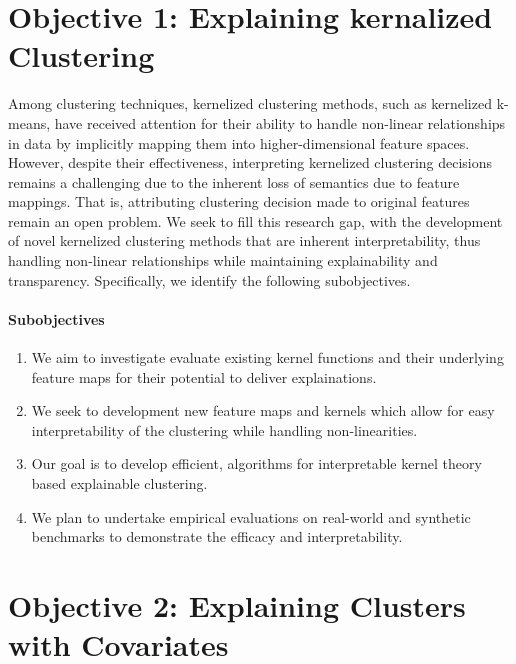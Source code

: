 \documentclass[10pt,a4paper]{article}
\begin{document}
\section{Objective 1: Explaining kernalized Clustering}

Among clustering techniques, kernelized clustering methods, such as kernelized k-means, have received attention for their ability to handle non-linear relationships in data by implicitly mapping them into higher-dimensional feature spaces. 
However, despite their effectiveness, interpreting kernelized clustering decisions remains a challenging due to the inherent loss of semantics due to feature mappings.
That is, attributing clustering decision made to original features remain an open problem. 
We seek to fill this research gap, with the development of novel kernelized clustering methods that are inherent interpretability, thus handling non-linear relationships while maintaining explainability and transparency.
Specifically, we identify the following subobjectives.
\paragraph{Subobjectives} 
\begin{enumerate}
   \item We aim to investigate evaluate existing kernel functions and their underlying feature maps for their potential to deliver explainations.  
   \item We seek to development new feature maps and kernels which allow for easy interpretability of the clustering while handling non-linearities.
   \item Our goal is to develop efficient, algorithms for interpretable kernel theory based explainable clustering.
   \item We plan to undertake empirical evaluations on real-world and synthetic benchmarks to demonstrate the efficacy and interpretability.   
\end{enumerate}

\section{Objective 2: Explaining Clusters with Covariates}
\end{document}
